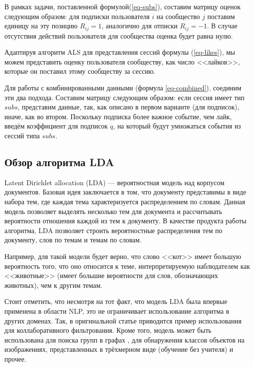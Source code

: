 \documentclass[times,specification,annotation]{itmo-student-thesis}
\begin{document}
В рамках задачи, поставленной формулой(\ref{eq-subs}), составим матрицу оценок следующим образом: для подписки пользователя $i$ на сообщество $j$ поставим единицу на эту позицию $R_{ij} = 1$, аналогично для отписки $R_{ij} = - 1$. В случае отсутствия действий пользователя для сообщества оценка будет равна нулю.

Адаптируя алгоритм ALS \cite{koren2009} для представления сессий формулы (\ref{eq-likes}), мы можем представить оценку пользователя сообществу, как число <<лайков>>, которые он поставил этому сообществу за сессию.

Для работы с комбинированными данными (формула \ref{eq-combined}), соединим эти два подхода. Составим матрицу следующим образом: если сессия имеет тип $subs$, представим данные, так, как описано в первом варианте (для подписок), иначе, как во втором. Поскольку подписка более важное событие, чем лайк, введём коэффициент для подписок $q$, на который будут умножаться события из сессий типа $subs$.   


\subsection{Обзор алгоритма LDA}\label{sec:lda}

Latent Dirichlet allocation (LDA) \cite{lda2003} --- вероятностная модель над корпусом документов. Базовая идея заключается в том, что документу представимы в виде набора тем, где каждая тема характеризуется распределением по словам. Данная модель позволяет выделять несколько тем для документа и рассчитывать вероятности отношения каждой из тем к документу.
В качестве продукта работы алгоритма, LDA позволяет строить вероятностные распределения тем по документу, слов по темам и темам по словам.

Например, для такой модели будет верно, что слово <<кот>> имеет большую вероятность того, что оно относится к теме, интерпретируемую наблюдателем как <<животные>> (имеет большие вероятности для слов, обозначающих животных), чем к другим темам. 

Стоит отметить, что несмотря на тот факт, что модель LDA была впервые применена в области NLP, это не ограничивает использование алгоритма в других доменах. Так, в оригинальной статье \cite{lda2003} приводится пример использования для коллаборативного фильтрования. Кроме того, модель может быть использована для поиска групп в графах \cite{Henderson2009}, для обнаружения классов объектов на изображениях, представленных в трёхмерном виде (обучение без учителя) \cite{Endres2009} и прочее.
\end{document}
